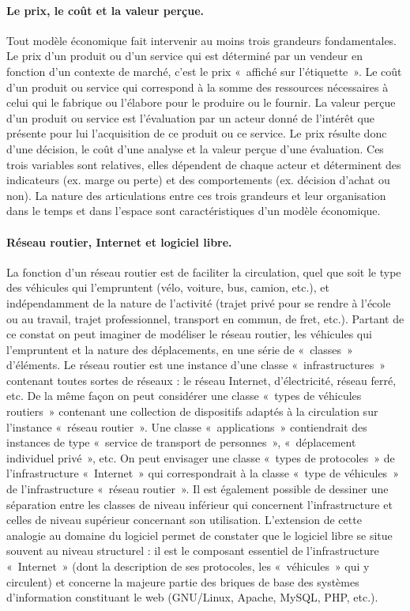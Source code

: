 \documentclass{FramateX}
\begin{document}
\begin{refsection}
\paragraph{Le prix, le coût et la valeur perçue.}

Tout modèle économique fait intervenir au moins trois grandeurs
fondamentales. Le prix d'un produit ou d'un service qui est déterminé
par un vendeur en fonction d'un contexte de marché, c'est le prix
«~affiché sur l'étiquette~». Le coût d'un produit ou service qui
correspond à la somme des ressources nécessaires à celui qui le
fabrique ou l'élabore pour le produire ou le fournir. La valeur perçue
d'un produit ou service est l'évaluation par un acteur donné de
l'intérêt que présente pour lui l'acquisition de ce produit ou ce
service. Le prix résulte donc d'une décision, le coût d'une analyse et
la valeur perçue d'une évaluation. Ces trois variables sont relatives,
elles dépendent de chaque acteur et déterminent des indicateurs (ex.
marge ou perte) et des comportements (ex. décision d'achat ou non). La
nature des articulations entre ces trois grandeurs et leur organisation
dans le temps et dans l'espace sont caractéristiques d'un modèle
économique.

\paragraph{Réseau routier, Internet et logiciel libre.}
La fonction d'un réseau routier est de faciliter la circulation, quel
que soit le type des véhicules qui l'empruntent (vélo, voiture, bus,
camion, etc.), et indépendamment de la nature de l'activité (trajet
privé pour se rendre à l'école ou au travail, trajet professionnel,
transport en commun, de fret, etc.). Partant de ce constat on peut
imaginer de modéliser le réseau routier, les véhicules qui l'empruntent
et la nature des déplacements, en une série de «~classes~» d'éléments.
Le réseau routier est une instance d'une classe «~infrastructures~»
contenant toutes sortes de réseaux : le réseau Internet, d'électricité,
réseau ferré, etc. De la même façon on peut considérer une classe
«~types de véhicules routiers~» contenant une collection de dispositifs
adaptés à la circulation sur l'instance «~réseau routier~». Une classe
«~applications~» contiendrait des instances de type «~service de
transport de personnes~», «~déplacement individuel privé~», etc. On
peut envisager une classe «~types de protocoles~» de l'infrastructure
«~Internet~» qui correspondrait à la classe «~type de véhicules~» de
l'infrastructure «~réseau routier~». Il est également possible de
dessiner une séparation entre les classes de niveau inférieur qui
concernent l'infrastructure et celles de niveau supérieur concernant
son utilisation. L'extension de cette analogie au domaine du logiciel
permet de constater que le logiciel libre se situe souvent au niveau
structurel : il est le composant essentiel de l'infrastructure
«~Internet~» (dont la description de ses protocoles, les «~véhicules~»
qui y circulent) et concerne la majeure partie des briques de base des
systèmes d'information constituant le web (GNU/Linux, Apache, MySQL,
PHP, etc.).


\end{refsection}
\end{document}
